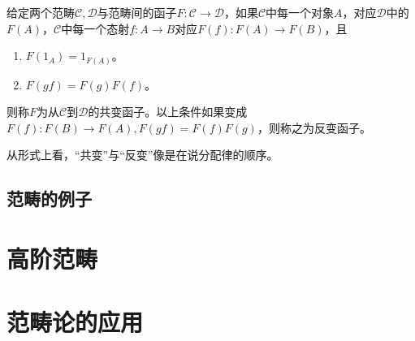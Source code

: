 \begin{definition}[共变与反变函子]
给定两个范畴$\mathcal{C,D}$与范畴间的函子$F\colon \mathcal{C}\rightarrow\mathcal{D}$，如果$\mathcal{C}$中每一个对象$A$，对应$\mathcal{D}$中的$F(A)$，$\mathcal{C}$中每一个态射$f\colon A\rightarrow B$对应$F(f)\colon F(A)\rightarrow F(B)$，且
\begin{enumerate}
	\item $F(1_A)=1_{F(A)}$。
	\item $F(gf)=F(g)F(f)$。
\end{enumerate}
则称$F$为从$\mathcal{C}$到$\mathcal{D}$的共变函子。以上条件如果变成$F(f)\colon F(B)\rightarrow F(A),F(gf)=F(f)F(g)$，则称之为反变函子。
\end{definition}

从形式上看，“共变”与“反变”像是在说分配律的顺序。
\subsection{范畴的例子}

\section{高阶范畴}


\section{范畴论的应用}
